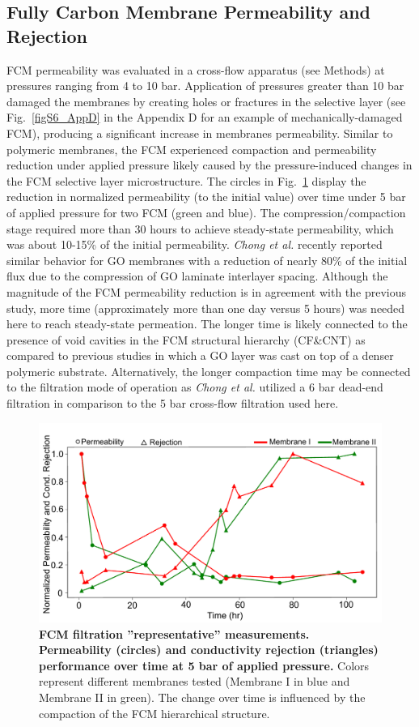 \subsection{Fully Carbon Membrane Permeability and Rejection }
FCM permeability was evaluated in a cross-flow apparatus (see Methods) at pressures ranging from 4 to 10 bar. Application of pressures greater than 10 bar damaged the membranes by creating holes or fractures in the selective layer (see Fig.~\ref{figS6_AppD} in the Appendix D for an example of mechanically-damaged FCM), producing a significant increase in membranes permeability. Similar to polymeric membranes, the FCM experienced compaction and permeability reduction under applied pressure likely caused by the pressure-induced changes in the FCM selective layer microstructure. The circles in Fig.~\ref{Fig2_pap5} display the reduction in normalized permeability (to the initial value) over time under 5 bar of applied pressure for two FCM (green and blue). The compression/compaction stage required more than 30 hours to achieve steady-state permeability, which was about 10-15\% of the initial permeability. \textit{Chong et al.} recently reported similar behavior for GO membranes with a reduction of nearly 80\% of the initial flux due to the compression of GO laminate interlayer spacing.\cite{chong2018water} Although the magnitude of the FCM permeability reduction is in agreement with the previous study, more time (approximately more than one day versus 5 hours) was needed here to reach steady-state permeation. The longer time is likely connected to the presence of void cavities in the FCM structural hierarchy (CF\&CNT) as compared to previous studies in which a GO layer was cast on top of a denser polymeric substrate. Alternatively, the longer compaction time may be connected to the filtration mode of operation as \textit{Chong et al.} utilized a 6 bar dead-end filtration in comparison to the 5 bar cross-flow filtration used here.\cite{chong2018water}

\begin{figure}[h!]
  \centering
  \includegraphics[width=5in]{paper5/Fig2.pdf}
  \caption{\textbf{FCM filtration ''representative'' measurements. Permeability (circles) and conductivity rejection (triangles) performance over time at 5 bar of applied pressure.} Colors represent different membranes tested (Membrane I in blue and Membrane II in green). The change over time is influenced by the compaction of the FCM hierarchical structure.}
  \label{Fig2_pap5}
\end{figure}


